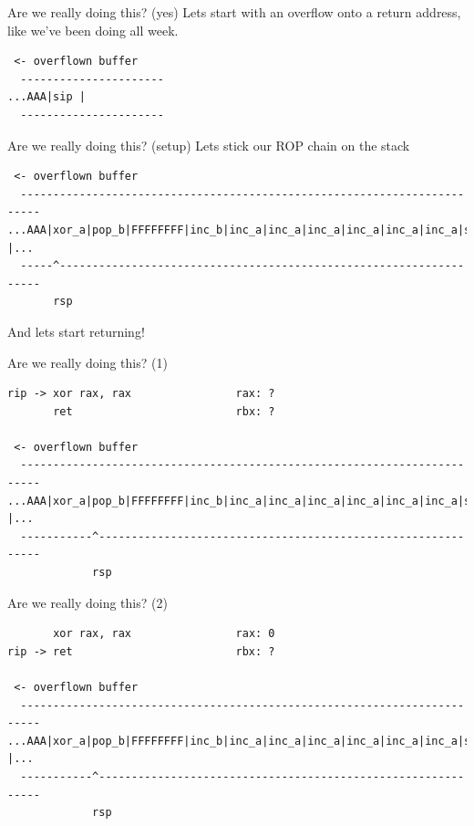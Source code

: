 \documentclass[9pt,aspectratio=169]{beamer}
\begin{document}
\begin{frame}[label={sec:org6b673f1},fragile]{Are we really doing this? (yes)}
 Lets start with an overflow onto a return address, like we've been doing all week.

\begin{verbatim}
 <- overflown buffer 
  ----------------------
...AAA|sip |
  ----------------------
\end{verbatim}
\end{frame}
\begin{frame}[label={sec:org918a3f3},fragile]{Are we really doing this? (setup)}
 Lets stick our ROP chain on the stack

\begin{verbatim}
 <- overflown buffer 
  -------------------------------------------------------------------------
...AAA|xor_a|pop_b|FFFFFFFF|inc_b|inc_a|inc_a|inc_a|inc_a|inc_a|inc_a|sys |...
  -----^-------------------------------------------------------------------
       rsp
\end{verbatim}

And lets start returning!
\end{frame}
\begin{frame}[label={sec:orgbbc6d62},fragile]{Are we really doing this? (1)}
 \begin{verbatim}
rip -> xor rax, rax                rax: ?
       ret                         rbx: ?

 <- overflown buffer 
  -------------------------------------------------------------------------
...AAA|xor_a|pop_b|FFFFFFFF|inc_b|inc_a|inc_a|inc_a|inc_a|inc_a|inc_a|sys |...
  -----------^-------------------------------------------------------------
             rsp
\end{verbatim}
\end{frame}

\begin{frame}[label={sec:org4c16597},fragile]{Are we really doing this? (2)}
 \begin{verbatim}
       xor rax, rax                rax: 0
rip -> ret                         rbx: ?

 <- overflown buffer 
  -------------------------------------------------------------------------
...AAA|xor_a|pop_b|FFFFFFFF|inc_b|inc_a|inc_a|inc_a|inc_a|inc_a|inc_a|sys |...
  -----------^-------------------------------------------------------------
             rsp
\end{verbatim}
\end{frame}
\end{document}
